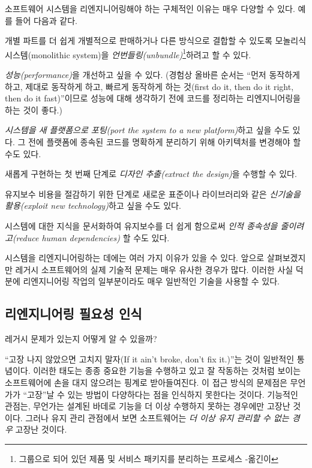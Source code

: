 \documentclass[a4paper,10pt,twoside]{book}
\begin{document}
소프트웨어 시스템을 리엔지니어링해야 하는 구체적인 이유는 매우 다양할 수 있다. 예를 들어 다음과 같다.
\begin{bulletlist}
  \item 개별 파트를 더 쉽게 개별적으로 판매하거나 다른 방식으로 결합할 수 있도록 모놀리식 시스템(monolithic system)을 \emph{언번들링(unbundle)}\footnote{그룹으로 되어 있던 제품 및 서비스 패키지를 분리하는 프로세스 -옮긴이}하려고 할 수 있다.

  \item \emph{성능(performance)}을 개선하고 싶을 수 있다. (경험상 올바른 순서는 ``먼저 동작하게 하고, 제대로 동작하게 하고, 빠르게 동작하게 하는 것(first do it, then do it right, then do it fast)''이므로 성능에 대해 생각하기 전에 코드를 정리하는 리엔지니어링을 하는 것이 좋다.)

  \item \emph{시스템을 새 플랫폼으로 포팅(port the system to a new platform)}하고 싶을 수도 있다. 그 전에 플랫폼에 종속된 코드를 명확하게 분리하기 위해 아키텍처를 변경해야 할 수도 있다.

  \item 새롭게 구현하는 첫 번째 단계로 \emph{디자인 추출(extract the design)}을 수행할 수 있다.

  \item 유지보수 비용을 절감하기 위한 단계로 새로운 표준이나 라이브러리와 같은 \emph{신기술을 활용(exploit new technology)}하고 싶을 수도 있다.
  
  \item 시스템에 대한 지식을 문서화하여 유지보수를 더 쉽게 함으로써 \emph{인적 종속성을 줄이려고(reduce human dependencies)} 할 수도 있다.
\end{bulletlist}

시스템을 리엔지니어링하는 데에는 여러 가지 이유가 있을 수 있다. 앞으로 살펴보겠지만 레거시 소프트웨어의 실제 기술적 문제는 매우 유사한 경우가 많다. 이러한 사실 덕분에 리엔지니어링 작업의 일부분이라도 매우 일반적인 기술을 사용할 수 있다.

\subsection*{리엔지니어링 필요성 인식}

레거시 문제가 있는지 어떻게 알 수 있을까? 

``고장 나지 않았으면 고치지 말자(If it ain't broke, don't fix it.)''는 것이 일반적인 통념이다. 이러한 태도는 종종 중요한 기능을 수행하고 있고 잘 작동하는 것처럼 보이는 소프트웨어에 손을 대지 않으려는 핑계로 받아들여진다. 이 접근 방식의 문제점은 무언가가 ``고장''날 수 있는 방법이 다양하다는 점을 인식하지 못한다는 것이다. 기능적인 관점는, 무언가는 설계된 바데로 기능을 더 이상 수행하지 못하는 경우에만 고장난 것이다. 그러나 유지 관리 관점에서 보면 소프트웨어는 \emph{더 이상 유지 관리할 수 없는 경우} 고장난 것이다.
\end{document}
